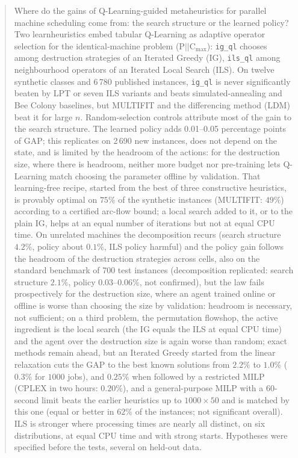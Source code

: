 \documentclass[final,3p,times,11pt,authoryear]{elsarticle}
\begin{document}
\begin{frontmatter}
\begin{abstract}
Where do the gains of Q-Learning-guided metaheuristics for parallel machine
scheduling come from: the search structure or the learned policy? Two
learnheuristics embed tabular Q-Learning as adaptive operator selection for the
identical-machine problem (P$||$C$_{\max}$): \texttt{ig\_ql} chooses among
destruction strategies of an Iterated Greedy (IG), \texttt{ils\_ql} among
neighbourhood operators of an Iterated Local Search (ILS). On twelve synthetic
classes and 6\,780 published instances, \texttt{ig\_ql} is never significantly
beaten by LPT or seven ILS variants and beats simulated-annealing and Bee Colony
baselines, but MULTIFIT and the differencing method (LDM) beat it for large $n$.
Random-selection controls attribute most of the gain to the search structure.
The learned policy adds 0.01--0.05 percentage points of GAP; this replicates on
2\,690 new instances, does not depend on the state, and is limited by the
headroom of the actions: for the destruction size, where there is headroom,
neither more budget nor pre-training lets Q-Learning match choosing the
parameter offline by validation. That learning-free recipe, started from the best
of three constructive heuristics, is provably optimal on $75\%$ of the synthetic
instances (MULTIFIT: $49\%$) according to a certified arc-flow bound; a local
search added to it, or to the plain IG, helps at an equal number of iterations
but not at equal CPU time. On
unrelated machines the decomposition recurs (search structure $4.2\%$, policy
about $0.1\%$, ILS policy harmful) and the policy gain follows the headroom of the destruction strategies
across cells, also on the standard benchmark of 700 test instances (decomposition replicated: search structure $2.1\%$, policy $0.03$--$0.06\%$,
not confirmed), but the law fails prospectively for the destruction size, where an agent trained online or offline is worse than choosing the size by validation: headroom is necessary, not sufficient; on a third problem, the permutation flowshop, the active ingredient is the local search (the IG equals the ILS at equal CPU time) and the agent over the destruction size is again worse than random; exact methods remain ahead, but an Iterated Greedy started from the linear relaxation cuts the
GAP to the best known solutions from $2.2\%$ to $1.0\%$ ($0.3\%$ for $1000$ jobs), and $0.25\%$ when followed by a restricted MILP (CPLEX in two hours: $0.20\%$), and a general-purpose MILP with a 60-second limit beats the earlier heuristics up to $1000\times50$ and is matched by this one
(equal or better in $62\%$ of the instances; not significant overall). ILS is stronger where processing times are nearly all distinct, on
six distributions, at equal CPU time and with strong starts. Hypotheses were
specified before the tests, several on held-out data.
\end{abstract}


\end{frontmatter}
\end{document}

